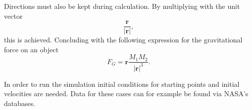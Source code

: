 Directions must also be kept during calculation. By multiplying
with the unit vector \[ \frac{\mathbf{r}}{|\mathbf{r}|}, \] this is
achieved. Concluding with the following expression for the
gravitational force on an object \[ F_G = \mathbf{r}
\frac{M_1 M_2}{|\mathbf{r}|^3}. \]

In order to run the simulation initial conditions for starting
points and initial velocities are needed. Data for these cases can for
example be found via NASA's databases.
%
